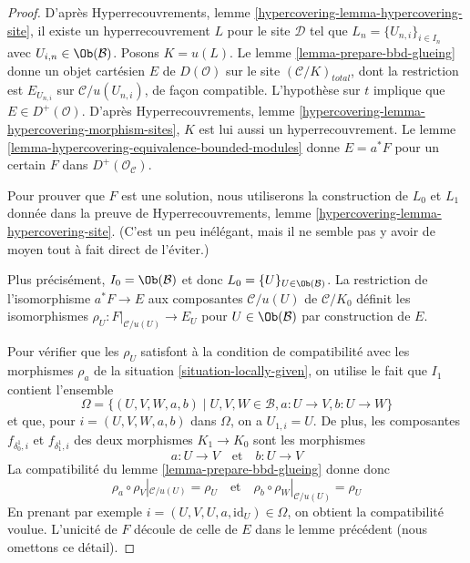 \begin{proof}
D'après Hyperrecouvrements, lemme \ref{hypercovering-lemma-hypercovering-site},
il existe un hyperrecouvrement $L$ pour le site $\mathcal{D}$ tel que
$L_n = \{U_{n, i}\}_{i \in I_n}$ avec $U_{i, n} \in \Ob(\mathcal{B})$.
Posons $K = u(L)$. Le lemme \ref{lemma-prepare-bbd-glueing} donne
un objet cartésien $E$ de $D(\mathcal{O})$ sur le site
$(\mathcal{C}/K)_{total}$, dont la restriction est $E_{U_{n, i}}$ sur
$\mathcal{C}/u(U_{n, i})$, de façon compatible.
L'hypothèse sur $t$ implique que $E \in D^+(\mathcal{O})$.
D'après Hyperrecouvrements, lemme \ref{hypercovering-lemma-hypercovering-morphism-sites},
$K$ est lui aussi un hyperrecouvrement.
Le lemme \ref{lemma-hypercovering-equivalence-bounded-modules}
donne $E = a^*F$ pour un certain $F$ dans $D^+(\mathcal{O}_\mathcal{C})$.

\medskip\noindent
Pour prouver que $F$ est une solution, nous utiliserons la construction de
$L_0$ et $L_1$ donnée dans la preuve de
Hyperrecouvrements, lemme \ref{hypercovering-lemma-hypercovering-site}.
(C'est un peu inélégant, mais il ne semble pas y avoir de moyen
tout à fait direct de l'éviter.)

\medskip\noindent
Plus précisément, $I_0 = \Ob(\mathcal{B})$ et donc
$L_0 = \{U\}_{U \in \Ob(\mathcal{B})}$.
La restriction de l'isomorphisme $a^*F \to E$ aux composantes
$\mathcal{C}/u(U)$ de $\mathcal{C}/K_0$ définit les isomorphismes
$\rho_U : F|_{\mathcal{C}/u(U)} \to E_U$ pour $U \in \Ob(\mathcal{B})$
par construction de $E$.

\medskip\noindent
Pour vérifier que les $\rho_U$ satisfont à la condition de compatibilité
avec les morphismes $\rho_a$ de la situation \ref{situation-locally-given},
on utilise le fait que $I_1$ contient l'ensemble
$$
\Omega =
\{(U, V, W, a, b) \mid U, V, W \in \mathcal{B}, a : U \to V, b : U \to W\}
$$
et que, pour $i = (U, V, W, a, b)$ dans $\Omega$, on a
$U_{1, i} = U$. De plus, les composantes $f_{\delta^1_0, i}$ et
$f_{\delta^1_1, i}$ des deux morphismes $K_1 \to K_0$ sont les morphismes
$$
a : U \to V \quad\text{et}\quad b : U \to V
$$
La compatibilité du
lemme \ref{lemma-prepare-bbd-glueing} donne donc
$$
\rho_a \circ \rho_V|_{\mathcal{C}/u(U)} = \rho_U
\quad\text{et}\quad
\rho_b \circ \rho_W|_{\mathcal{C}/u(U)} = \rho_U
$$
En prenant par exemple $i = (U, V, U, a, \text{id}_U) \in \Omega$, on obtient
la compatibilité voulue. L'unicité de $F$ découle
de celle de $E$ dans le lemme précédent (nous omettons ce détail).
\end{proof}

